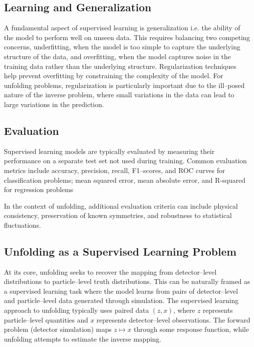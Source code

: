     \subsection{Learning and Generalization}
        A fundamental aspect of supervised learning is generalization i.e. the ability of the model to perform well on unseen data.
        This requires balancing two competing concerns, underfitting, when the model is too simple to capture the underlying structure of the data, and overfitting, when the model captures noise in the training data rather than the underlying structure.
        Regularization techniques help prevent overfitting by constraining the complexity of the model.
        For unfolding problems, regularization is particularly important due to the ill--posed nature of the inverse problem, where small variations in the data can lead to large variations in the prediction.
    \subsection{Evaluation}
        Supervised learning models are typically evaluated by measuring their performance on a separate test set not used during training.
        Common evaluation metrics include accuracy, precision, recall, F1--scores, and ROC curves for classification problems; mean squared error, mean absolute error, and R-squared for regression problems

        In the context of unfolding, additional evaluation criteria can include physical consistency, preservation of known symmetries, and robustness to statistical fluctuations.
    \subsection{Unfolding as a Supervised Learning Problem}
        At its core, unfolding seeks to recover the mapping from detector--level distributions to particle--level truth distributions.
        This can be naturally framed as a supervised learning task where the model learns from pairs of detector--level and particle--level data generated through simulation.
        The supervised learning approach to unfolding typically uses paired data \((z, x)\), where \(z\) represents particle--level quantities and \(x\) represents detector--level observations.
        The forward problem (detector simulation) maps \(z \mapsto x\) through some response function, while unfolding attempts to estimate the inverse mapping.

